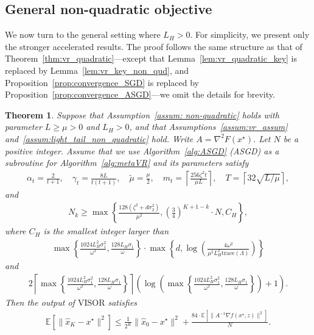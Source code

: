 \documentclass[11pt,twoside]{article}
\numberwithin{equation}{section}
\newcommand{\EE}{\mathbb{E}}
\newcommand{\trace}[1]{\mathrm{trace}\left(#1\right)}
\newcommand{\ceil}[1]{\left \lceil #1 \right \rceil }
\newcommand{\1}{\mathbf{1}}
\newtheorem{theorem}{Theorem}[section]
\theoremstyle{remark}
\theoremstyle{plain}
\newcommand{\liph}{L_H}
\newcommand{\algname}{\mathrm{VISOR}}
\newcommand{\ch}{C_H}
\newcommand{\lmin}{\omega}
\begin{document}
\subsection{General non-quadratic objective}
We now turn to the general setting where $\liph >0$. For simplicity, we present only the stronger accelerated results. The proof follows the same structure as that of Theorem~\ref{thm:vr_quadratic}---except that Lemma~\ref{lem:vr_quadratic_key} is replaced by Lemma~\ref{lem:vr_key_non_qud}, and Proposition~\ref{prop:convergence_SGD} is replaced by Proposition~\ref{prop:convergence_ASGD}---we omit the details for brevity.
\begin{theorem}\label{thm:vr_nonquadratic}
Suppose that  Assumption~\ref{assum: non-quadratic} holds with parameter $L \ge \mu >0$ and $\liph > 0$, and that Assumptions~\ref{assum:vr_assum} and~\ref{assum:light_tail_non_quadratic} hold. Write $A = \nabla^2 F(x^\star)$. Let $N$ be a positive integer. Assume that we use Algorithm~\ref{alg:ASGD} (ASGD) as a subroutine  for Algorithm~\ref{alg:metaVR} and its parameters satisfy
\begin{align*}
	\alpha_t = \frac{2}{t+1}, \quad \gamma_t = \frac{8L}{t(t+1)}, \quad \tilde \mu = \frac{\mu}{2}, \quad m_t = \ceil{\frac{256\zeta^2 t}{\mu L}},  \quad T = \ceil{32\sqrt{L/\mu}},
\end{align*}
and 
\begin{align*}
	N_k \ge \max\left\{ \frac{128(\zeta^2 + d\sigma_2^2)}{\mu^2}, \left( \frac{3}{4} \right)^{K+1-k} \cdot N, \ch \right\}, 
\end{align*}
where $\ch$ is the smallest integer larger than 
\begin{align*}
	\max \left\{ \frac{1024 \liph^2  \sigma_1^2}{\lmin^2}, \frac{128\liph \sigma_1}{\lmin}\right\} \cdot \max\left\{ d, \log \left(\frac{4 \lmin^2}{\mu^2 \liph^2 \trace{\Lambda}}\right) \right\}
\end{align*}
and 
\begin{align*}
	2\ceil{\max \left\{ \frac{1024 \liph^2  \sigma_1^2}{\lmin^2}, \frac{128\liph \sigma_1}{\lmin}\right\}} \left( \log \left( \max \left\{ \frac{1024 \liph^2  \sigma_1^2}{\lmin^2}, \frac{128\liph \sigma_1}{\lmin}\right\}\right) +1\right).
\end{align*}
Then the output of $\algname$ satisfies 
\begin{align*}
	\EE[\|\widehat x_K -  x^\star\|^2] \le \frac{1}{2^K} \| \widehat x_0 - x^\star\|^2 + \frac{84 \cdot \EE[\|A^{-1} \nabla f(x^\star, z)\|^2]}{N}  .
\end{align*}
\end{theorem}
\end{document}
